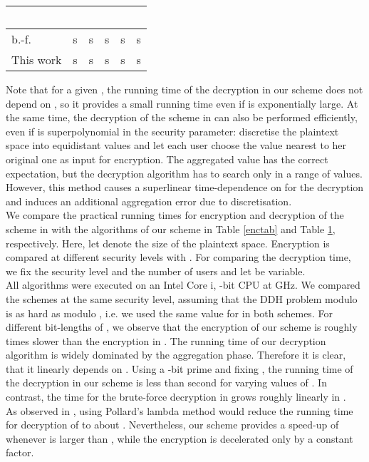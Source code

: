 \documentclass[10pt]{extarticle}
\begin{document}
\begin{table}[t]
\centering
\begin{tabular}{l||c|c|c|c|c} \,\,\,\,\,\,\,\,\, &  &  &  &  & \\ \hline \cite{2} b.-f. &  s &  s &  s &  s &  s\\ This work &  s &  s &  s &  s &  s
\end{tabular}
\label{dectab}
\end{table}

Note that for a given , the running time of the decryption in our scheme does not depend on , so it provides a small running time even if  is exponentially large. At the same time, the decryption of the scheme in \cite{2} can also be performed efficiently, even if  is superpolynomial in the security parameter: discretise the plaintext space into  equidistant values and let each user choose the value nearest to her original one as input for encryption. The aggregated value has the correct expectation, but the decryption algorithm has to search only in a range of  values. However, this method causes a superlinear time-dependence on  for the decryption and induces an additional aggregation error due to discretisation.\\
We compare the practical running times for encryption and decryption of the scheme in \cite{2} with the algorithms of our scheme in Table \ref{enctab} and Table \ref{dectab}, respectively. Here, let  denote the size of the plaintext space. Encryption is compared at different security levels with . For comparing the decryption time, we fix the security level and the number of users and let  be variable.\\
All algorithms were executed on an Intel Core i, -bit CPU at  GHz. We compared the schemes at the same security level, assuming that the DDH problem modulo  is as hard as modulo , i.e. we used the same value for  in both schemes. For different bit-lengths of , we observe that the encryption of our scheme is roughly  times slower than the encryption in \cite{2}. The running time of our decryption algorithm is widely dominated by the aggregation phase. Therefore it is clear, that it linearly depends on . Using a -bit prime and fixing , the running time of the decryption in our scheme is less than  second for varying values of . In contrast, the time for the brute-force decryption in \cite{2} grows roughly linearly in .\\
As observed in \cite{2}, using Pollard's lambda method would reduce the running time for decryption of \cite{2} to about . Nevertheless, our scheme provides a speed-up of  whenever  is larger than , while the encryption is decelerated only by a constant factor.
\end{document}
